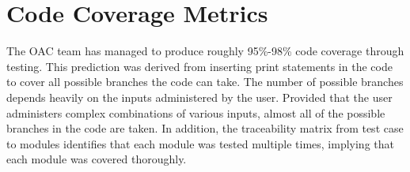 \documentclass[12pt, titlepage]{article}
\begin{document}
\newpage
\section{Code Coverage Metrics}

The OAC team has managed to produce roughly 95\%-98\% code coverage through testing. This prediction was derived from inserting print statements in the code to cover all possible branches the code can take. The number of possible branches depends heavily on the inputs administered by the user. Provided that the user administers complex combinations of various inputs, almost all of the possible branches in the code are taken. In addition, the traceability matrix from test case to modules identifies that each module was tested multiple times, implying that each module was covered thoroughly.



\end{document}
